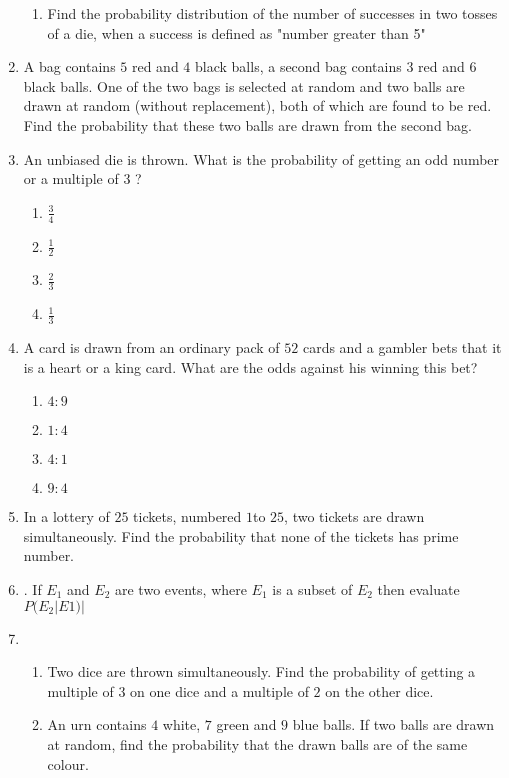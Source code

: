\documentclass{article}
\begin{document}
\begin{enumerate}
\begin{enumerate}
			\item Find the probability distribution of the number of successes in two tosses of a die, when a success is defined as "number greater than 5"
				\end{enumerate}
			\item A bag contains $5$ red and $4$ black balls, a second bag contains $3$ red and $6$ black balls. One of the two bags is selected at random and two balls are drawn at random (without replacement), both of which are found to be red. Find the probability that these two balls are drawn from the second bag.
		\item An unbiased die is thrown. What is the probability of getting an odd number or a multiple of $3$ ?
		\begin{enumerate}%
			\item $\frac{3}{4}$
				\item $\frac{1}{2}$
                		\item $\frac{2}{3}$
                		\item $\frac{1}{3}$
                        \end{enumerate}
		\item A card is drawn from an ordinary pack of $52$ cards and a gambler bets that it is a heart or a king card. What are the odds against his winning this bet?
			\begin{enumerate}%
				\item $4:9$
				\item $1:4$
				\item $4:1$
				\item $9:4$
			\end{enumerate}
		\item In a lottery of $25$ tickets, numbered $1 $to $25$, two tickets are drawn simultaneously. Find the probability that none of the tickets has prime number.
		\item . If $E_{1}$ and $E_{2}$ are two events, where $E_{1}$ is a subset of $E_{2}$ then evaluate $P( E_{2} |E 1 )|$
		\item \begin{enumerate}%
				\item Two dice are thrown simultaneously. Find the probability of getting a multiple of $3$ on one dice and a multiple of $2$ on the other dice.
				\item An urn contains $4$ white, $7$ green and $9$ blue balls. If two balls are drawn at random, find the probability that the drawn balls are of the same colour.
		\end{enumerate}

\end{enumerate}
\end{document}
